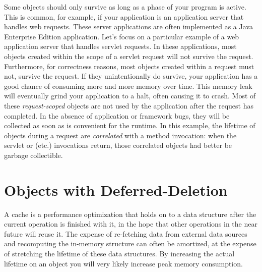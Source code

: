 Some objects should only survive as long as a phase of your program is active.
This is common, for example, if your application is an application server that
handles web requests. These server applications are often implemented as a Java
Enterprise Edition application. Let's focus on a particular example of a web
application server that handles servlet requests. In these applications, most
objects created within the scope of a servlet request will not survive the
request. Furthermore, for correctness reasons, most objects created within a
request must not, survive the request. If they unintentionally do survive,
your application has a good chance of consuming more and more memory over time.
 This memory leak will eventually grind your application to a
halt, often causing it to crash. Most of these \emph{request-scoped}
 objects are not used by the application after the
request has completed. In the absence of application or framework bugs, they will
be collected as soon as is convenient for the runtime. In this example, the
lifetime of objects during a request are \emph{correlated} with a method
invocation: when the servlet  or  (etc.) invocations
return, those correlated objects had better be garbage collectible.


\section{Objects with Deferred-Deletion}
\label{deferred-deletion}

A cache is a performance optimization that holds on to a data structure after the
current operation is finished with it, in the hope that other operations in the
near future will reuse it. The expense of re-fetching data from external data
sources and recomputing the in-memory structure can often be amortized, at the
expense of stretching the lifetime of these data structures. By increasing the
actual lifetime on an object you will very likely increase peak memory
consumption.








